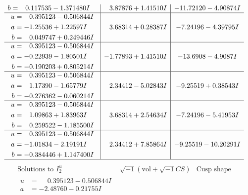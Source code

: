 \documentclass[1p]{elsarticle_modified}
\theoremstyle{definition}
\newcommand{\I}{\sqrt{-1}}
\begin{document}
$$\begin{array}{c|c|c}
\begin{aligned}
b &= \phantom{-}0.117535 - 1.371480 I\end{aligned}
 & \phantom{-}3.87876 + 1.41510 I & -11.72120 - 4.90874 I \\ \hline\begin{aligned}
u &= \phantom{-}0.395123 - 0.506844 I \\
a &= -1.25536 + 1.22597 I \\
b &= \phantom{-}0.049747 + 0.249446 I\end{aligned}
 & \phantom{-}3.68314 + 0.28387 I & -7.24196 - 4.39795 I \\ \hline\begin{aligned}
u &= \phantom{-}0.395123 - 0.506844 I \\
a &= -0.22939 - 1.80501 I \\
b &= -0.190203 + 0.805214 I\end{aligned}
 & -1.77893 + 1.41510 I & -13.6908 - 4.9087 I \\ \hline\begin{aligned}
u &= \phantom{-}0.395123 - 0.506844 I \\
a &= \phantom{-}1.17390 - 1.65779 I \\
b &= -0.276362 - 0.060214 I\end{aligned}
 & \phantom{-}2.34412 - 5.02843 I & -9.25519 + 0.38543 I \\ \hline\begin{aligned}
u &= \phantom{-}0.395123 - 0.506844 I \\
a &= \phantom{-}1.09863 + 1.83963 I \\
b &= \phantom{-}0.259522 - 1.185500 I\end{aligned}
 & \phantom{-}3.68314 + 2.54634 I & -7.24196 - 5.41953 I \\ \hline\begin{aligned}
u &= \phantom{-}0.395123 - 0.506844 I \\
a &= -1.01834 - 2.19191 I \\
b &= -0.384446 + 1.147400 I\end{aligned}
 & \phantom{-}2.34412 + 7.85864 I & -9.25519 - 10.20291 I\\
 \hline 
 \end{array}$$\newpage$$\begin{array}{c|c|c}  
\text{Solutions to }I^u_{2}& \I (\text{vol} + \sqrt{-1}CS) & \text{Cusp shape}\\
 \hline 
\begin{aligned}
u &= \phantom{-}0.395123 - 0.506844 I \\
a &= -2.48760 - 0.21755 I \\

\end{aligned}
\end{array}$$
\end{document}
